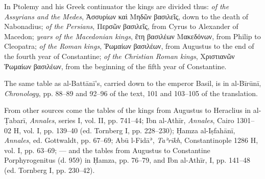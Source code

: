 \documentclass[11pt]{article}
\newcommand{\Pg}[1]{\marginpar{\footnotesize\color{gray}#1}}
\begin{document}
\par In Ptolemy and his Greek continuator the kings are divided thus: \emph{of the Assyrians and the Medes}, {\greekfont Ἀσσυρίων καὶ Μηδῶν βασιλεῖς}, down to the death of Nabonadius; \emph{of the Persians}, {\greekfont Περσῶν βασιλεῖς}, from Cyrus to Alexander of Macedon; \emph{years of the Macedonian kings}, {\greekfont ἔτη βασιλέων Μακεδόνων}, from Philip to Cleopatra; \emph{of the Roman kings}, {\greekfont Ῥωμαίων βασιλέων}, from Augustus to the end of the fourth year of Constantine; \emph{of the Christian Roman kings}, {\greekfont Χριστιανῶν Ῥωμαίων βασιλέων}, from the beginning of the fifth year of Constantine.\par
\par The same table as al-Battānī's, carried down to the emperor Basil, is in al-Bīrūnī, \emph{Chronology}, pp. 88–89 and 92–96 of the text, 101 and 103–105 of the translation.\par
\par \Pg{II 192}From other sources come the tables of the kings from Augustus to Heraclius in al-Ṭabarī, \emph{Annales}, series I, vol. II, pp. 741–44; Ibn al-Athīr, \emph{Annales}, Cairo 1301–02 H, vol. I, pp. 139–40 (ed. Tornberg I, pp. 228–230); Ḥamza al-Iṣfahānī, \emph{Annales}, ed. Gottwaldt, pp. 67–69; Abū l-Fidāʾ, \emph{Taʾrīkh}, Constantinople 1286 H, vol. I, pp. 63–69; — and the tables from Augustus to Constantine Porphyrogenitus (d. 959) in Ḥamza, pp. 76–79, and Ibn al-Athīr, I, pp. 141–48 (ed. Tornberg I, pp. 230–42).\par
\end{document}
